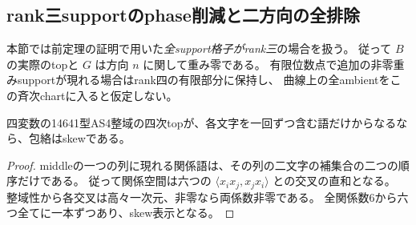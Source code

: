 \subsection{rank三supportのphase削減と二方向の全排除}
\label{subsec:cubic-four-simple-curve-phase-reduction}
本節では前定理の証明で用いた\emph{全support格子がrank三}の場合を扱う。
従って $B$ の実際のtopと $G$ は方向 $n$ に関して重み零である。
有限位数点で追加の非零重みsupportが現れる場合はrank四の有限部分に保持し、
曲線上の全ambientをこの斉次chartに入ると仮定しない。

\begin{lemma}
\label{lem:cubic-multilinear-top-skew}
四変数の14641型AS4整域の四次topが、各文字を一回ずつ含む語だけからなるなら、包絡はskewである。
\end{lemma}
\begin{proof}
middleの一つの列に現れる関係語は、その列の二文字の補集合の二つの順序だけである。
従って関係空間は六つの $\langle x_ix_j,x_jx_i\rangle$ との交叉の直和となる。
整域性から各交叉は高々一次元、非零なら両係数非零である。
全関係数6から六つ全てに一本ずつあり、skew表示となる。
\end{proof}

